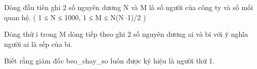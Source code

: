 Dòng đầu tiên ghi 2 số nguyên dương N và M là số người của công ty và số mối quan hệ. ( 1 ≤ N ≤ 1000, 1 ≤ M ≤ N(N–1)/2 )  

   Dòng thứ i trong M dòng tiếp theo ghi 2 số nguyên dương ai và bi với ý nghĩa người ai là sếp của bi.  

   Biết rằng giám đốc beo\_chay\_so luôn được ký hiệu là người thứ 1.